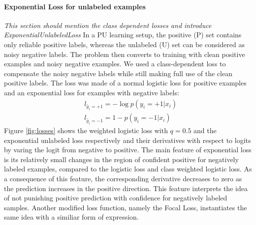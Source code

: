 \paragraph{Exponential Loss for unlabeled examples}
\noindent
\noindent \textit{This section should mention the class dependent losses and introduce ExponentialUnlabeledLoss}
In a PU learning setup, the positive (P) set contains only reliable positive labels, whereas the unlabeled (U) set can be considered as noisy negative labels.
The problem then converts to training with clean positive examples and noisy negative examples.
We used a class-dependent loss to compensate the noisy negative labels while still making full use of the clean positive labels.
The loss was made of a normal logistic loss for positive examples and an exponential loss \cite{tax2016class} for examples with negative labels:
\begin{equation*}
  \begin{aligned}
    & l_{\tilde{y_i}=+1} = - \log p(y_i=+1 \vert x_i) \\
    & l_{\tilde{y_i}=-1} = 1 - p(y_i=-1|x_i)
  \end{aligned}
\end{equation*}
Figure \ref{fig:losses} shows the weighted logistic loss with $q=0.5$ and the exponential unlabeled loss respectively and their derivatives with respect to logits by varing the logit from negative to positive.
The main feature of exponential loss is its relatively small changes in the region of confident positive for negatively labeled examples, compared to the logistic loss and class weighted logistic loss.
As a consequence of this feature, the corresponding derivative decreases to zero as the prediction increases in the positive direction.
This feature interprets the idea of not punishing positive prediction with confidence for negatively labeled samples.
Another modified loss function, namely the Focal Loss\cite{lin2017focal}, instantiates the same idea with a similiar form of expression.

